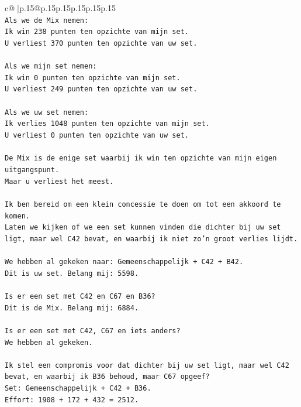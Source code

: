 \documentclass{article}
\begin{document}
{\begin{supertabular}{c@{$\;$}|p{.15\linewidth}@{}p{.15\linewidth}p{.15\linewidth}p{.15\linewidth}p{.15\linewidth}p{.15\linewidth}}
{{{\\ 
\texttt{Als we de Mix nemen:} \\
\texttt{Ik win 238 punten ten opzichte van mijn set.} \\
\texttt{U verliest 370 punten ten opzichte van uw set.} \\
\\ 
\texttt{Als we mijn set nemen:} \\
\texttt{Ik win 0 punten ten opzichte van mijn set.} \\
\texttt{U verliest 249 punten ten opzichte van uw set.} \\
\\ 
\texttt{Als we uw set nemen:} \\
\texttt{Ik verlies 1048 punten ten opzichte van mijn set.} \\
\texttt{U verliest 0 punten ten opzichte van uw set.} \\
\\ 
\texttt{De Mix is de enige set waarbij ik win ten opzichte van mijn eigen uitgangspunt.} \\
\texttt{Maar u verliest het meest.} \\
\\ 
\texttt{Ik ben bereid om een klein concessie te doen om tot een akkoord te komen.} \\
\texttt{Laten we kijken of we een set kunnen vinden die dichter bij uw set ligt, maar wel C42 bevat, en waarbij ik niet zo'n groot verlies lijdt.} \\
\\ 
\texttt{We hebben al gekeken naar: Gemeenschappelijk + C42 + B42.} \\
\texttt{Dit is uw set. Belang mij: 5598.} \\
\\ 
\texttt{Is er een set met C42 en C67 en B36?} \\
\texttt{Dit is de Mix. Belang mij: 6884.} \\
\\ 
\texttt{Is er een set met C42, C67 en iets anders?} \\
\texttt{We hebben al gekeken.} \\
\\ 
\texttt{Ik stel een compromis voor dat dichter bij uw set ligt, maar wel C42 bevat, en waarbij ik B36 behoud, maar C67 opgeef?} \\
\texttt{Set: Gemeenschappelijk + C42 + B36.} \\
\texttt{Effort: 1908 + 172 + 432 = 2512.} \\
}}}
\end{supertabular}}
\end{document}
